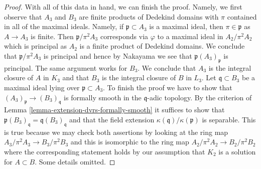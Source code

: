 \documentclass[10pt,a4paper]{amsart}
\theoremstyle{plain}
\theoremstyle{definition}
\theoremstyle{remark}
\numberwithin{equation}{subsection}
\begin{document}
\begin{proof}
\medskip\noindent
With all of this data in hand, we can finish the proof. Namely, we
first observe that $A_3$ and $B_3$ are finite products of
Dedekind domains with $\pi$ contained in all of the maximal ideals.
Namely, if $\mathfrak p \subset A_3$ is a maximal ideal, then
$\pi \in \mathfrak p$ as $A \to A_3$ is finite. Then $\mathfrak p/\pi^2 A_3$
corresponds via $\varphi$ to a maximal ideal in $A_2 / \pi^2A_2$
which is principal as $A_2$ is a finite product of Dedekind domains.
We conclude that $\mathfrak p/\pi^2 A_3$ is principal and hence by Nakayama 
we see that $\mathfrak p (A_3)_\mathfrak p$ is principal.
The same argument works for $B_3$. We conclude that
$A_3$ is the integral closure of $A$ in $K_3$
and that $B_3$ is the integral closure of $B$ in $L_3$.
Let $\mathfrak q \subset B_3$ be a maximal ideal lying
over $\mathfrak p \subset A_3$. To finish the proof we have
to show that $(A_3)_\mathfrak p \to (B_3)_\mathfrak q$ is
formally smooth in the $\mathfrak q$-adic topology. By the criterion of
Lemma \ref{lemma-extension-dvrs-formally-smooth} it suffices to show that
$\mathfrak p (B_3)_\mathfrak q = \mathfrak q (B_3)_\mathfrak q$
and that the field extension $\kappa(\mathfrak q)/\kappa(\mathfrak p)$
is separable. This is true because we may check both assertions
by looking at the ring map $A_3/\pi^2 A_3 \to B_3/\pi^2 B_3$
and this is isomorphic to the ring map
$A_2/\pi^2 A_2 \to B_2/\pi^2 B_2$ where the corresponding
statement holds by our assumption that $K_2$
is a solution for $A \subset B$. Some details omitted.
\end{proof}
\end{document}
